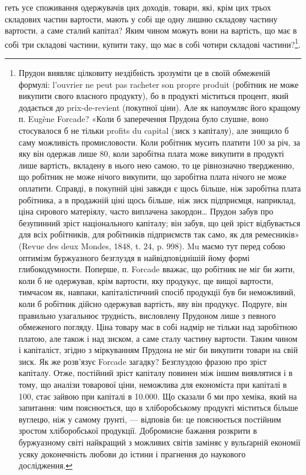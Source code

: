 \parcont{}  %
геть усе споживання одержувачів цих доходів, товари, які, крім цих трьох складових
частин вартости, мають у собі ще одну лишню складову частину вартости,
а саме сталий капітал? Яким чином можуть вони на вартість, що має в
собі три складові частини, купити таку, що має в собі чотири складові частини?\footnote{
Прудон виявляє цілковиту нездібність зрозуміти це в своїй обмеженій формулі: l’ouvrier ne peut
pas racheter son propre produit (робітник не може викупити свого власного продукту), бо в продукті
міститься процент, який додається до prix-de-revient (покупної ціни). Але як напоумляє його кращому
п. Eugène Forcade? «Коли б заперечення Прудона було слушне, воно стосувалося б не тільки profits du
capital (зиск з капіталу), але знищило б саму можливість промисловости. Коли робітник мусить платити
100 за річ, за яку він одержав лише 80, коли заробітна плата може викупити в продукті лише вартість,
вкладену в нього нею самою, то це рівнозначно твердженню, що робітник не може нічого викупити, що
заробітна плата нічого не може оплатити. Справді, в покупній ціні завжди є щось більше, ніж
заробітна плата робітника, а в продажній ціні щось більше, ніж зиск підприємця, наприклад, ціна
сирового матеріялу, часто виплачена закордон\dots{} Прудон забув про безупинний зріст національного
капіталу; він забув, що цей зріст відбувається для всіх робітників, для робітників підприємств так
само, як для ремесників» (Revue des deux Mondes, 1848, t. 24, p. 998). Mu маємо тут перед собою
оптимізм буржуазного безглуздя в найвідповіднішій йому формі глибокодумности. Поперше, п. Forcade
вважає, що робітник не міг би жити, коли б не одержував, крім вартости, яку продукує, ще вищої
вартости, тимчасом як, навпаки, капіталістичний спосіб продукції був би неможливий, коли б робітник
дійсно
одержував вартість, яву він продукує. Подруге, він правильно узагальнює трудність, висловлену
Прудоном лише з певного обмеженого погляду. Ціна товару має в собі надмір не тільки над заробітною
платою, але також і над зиском, а саме сталу частину вартости. Таким чином і капіталіст, згідно з
міркуванням Прудона не міг би викупити товари на свій зиск. Як же розв’язує Forcade загадку?
Безглуздою фразою про зріст капіталу. Отже, постійний зріст капіталу повинен між іншим виявлятися і
в тому, що аналізи товарової ціни, неможлива для економіста при капіталі в 100, стає зайвою при
капіталі в \num{10.000}. Що сказали б ми про хеміка, який на запитання: чим пояснюється, що в
хліборобському продукті міститься більше вуглецю, ніж у самому ґрунті, — відповів би: це пояснюється
постійним зростом хліборобської продукції. Добромисне бажання розкрити в буржуазному світі найкращий
з можливих світів заміняє у вульґарній економії усяку доконечність любови до істини і прагнення до
наукового дослідження.
}.

